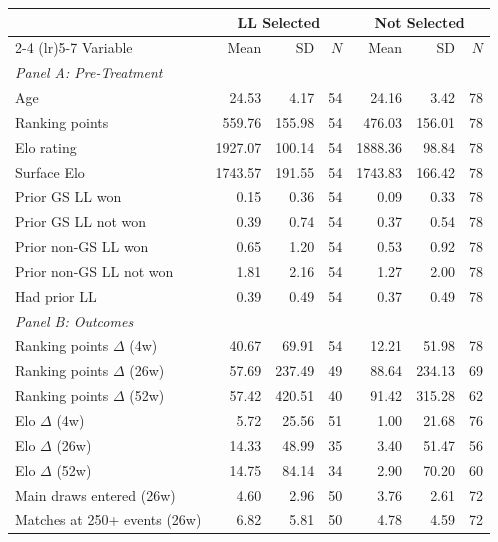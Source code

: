 \begin{tabular}{p{4cm} rrr rrr}
\toprule
 & \multicolumn{3}{c}{LL Selected} & \multicolumn{3}{c}{Not Selected} \\
\cmidrule(lr){2-4} \cmidrule(lr){5-7}
Variable & Mean & SD & $N$ & Mean & SD & $N$ \\
\midrule
\multicolumn{7}{l}{\textit{Panel A: Pre-Treatment}} \\
\quad Age & 24.53 & 4.17 & 54 & 24.16 & 3.42 & 78 \\
\quad Ranking points & 559.76 & 155.98 & 54 & 476.03 & 156.01 & 78 \\
\quad Elo rating & 1927.07 & 100.14 & 54 & 1888.36 & 98.84 & 78 \\
\quad Surface Elo & 1743.57 & 191.55 & 54 & 1743.83 & 166.42 & 78 \\
\quad Prior GS LL won & 0.15 & 0.36 & 54 & 0.09 & 0.33 & 78 \\
\quad Prior GS LL not won & 0.39 & 0.74 & 54 & 0.37 & 0.54 & 78 \\
\quad Prior non-GS LL won & 0.65 & 1.20 & 54 & 0.53 & 0.92 & 78 \\
\quad Prior non-GS LL not won & 1.81 & 2.16 & 54 & 1.27 & 2.00 & 78 \\
\quad Had prior LL & 0.39 & 0.49 & 54 & 0.37 & 0.49 & 78 \\
\midrule
\multicolumn{7}{l}{\textit{Panel B: Outcomes}} \\
\quad Ranking points $\Delta$ (4w) & 40.67 & 69.91 & 54 & 12.21 & 51.98 & 78 \\
\quad Ranking points $\Delta$ (26w) & 57.69 & 237.49 & 49 & 88.64 & 234.13 & 69 \\
\quad Ranking points $\Delta$ (52w) & 57.42 & 420.51 & 40 & 91.42 & 315.28 & 62 \\
\quad Elo $\Delta$ (4w) & 5.72 & 25.56 & 51 & 1.00 & 21.68 & 76 \\
\quad Elo $\Delta$ (26w) & 14.33 & 48.99 & 35 & 3.40 & 51.47 & 56 \\
\quad Elo $\Delta$ (52w) & 14.75 & 84.14 & 34 & 2.90 & 70.20 & 60 \\
\quad Main draws entered (26w) & 4.60 & 2.96 & 50 & 3.76 & 2.61 & 72 \\
\quad Matches at 250+ events (26w) & 6.82 & 5.81 & 50 & 4.78 & 4.59 & 72 \\
\bottomrule
\end{tabular}
